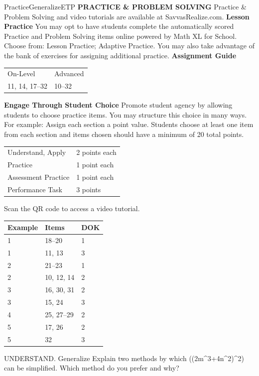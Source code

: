 \documentclass{article}
\newenvironment{item-analysis}{}{}      %
\newenvironment{practice}[2]{}{}        %
\newenvironment{te-addendum}[2]{}{}     %
\newcommand{\answer}[1]{}               %
\begin{document}
\begin{te-addendum}{Practice}{GeneralizeETP}
\textbf{PRACTICE \& PROBLEM SOLVING}
Practice \& Problem Solving and video tutorials are available at SavvasRealize.com.
\textbf{Lesson Practice} You may opt to have students complete the automatically scored Practice and Problem Solving items online powered by Math XL for School.
Choose from: Lesson Practice; Adaptive Practice.
You may also take advantage of the bank of exercises for assigning additional practice.
\textbf{Assignment Guide}
\begin{tabular}{ll}
On-Level & Advanced \\
11, 14, 17--32 & 10--32 \\
\end{tabular}
\textbf{Engage Through Student Choice}
Promote student agency by allowing students to choose practice items. You may structure this choice in many ways.
For example:
Assign each section a point value. Students choose at least one item from each section and items chosen should have a minimum of 20 total points.
\begin{tabular}{ll}
Understand, Apply & 2 points each \\
Practice & 1 point each \\
Assessment Practice & 1 point each \\
Performance Task & 3 points \\
\end{tabular}
Scan the QR code to access a video tutorial.
\end{te-addendum}
\begin{item-analysis}
\begin{tabular}{lll}
\toprule
Example & Items & DOK \\
\midrule
1 & 18--20 & 1 \\
1 & 11, 13 & 3 \\
2 & 21--23 & 1 \\
2 & 10, 12, 14 & 2 \\
3 & 16, 30, 31 & 2 \\
3 & 15, 24 & 3 \\
4 & 25, 27--29 & 2 \\
5 & 17, 26 & 2 \\
5 & 32 & 3 \\
\bottomrule
\end{tabular}
\end{item-analysis}
\begin{practice}{10}{2}
UNDERSTAND. Generalize Explain two methods by which ((2m^3+4n^2)^2) can be simplified. Which method do you prefer and why?
\answer{Use the algorithm for squaring a binomial or the FOIL method.}
\end{practice}
\end{document}
